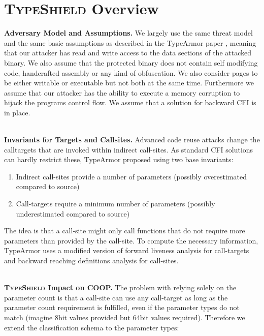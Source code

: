 \section{\textsc{TypeShield} Overview}
\label{chapter:TypeShild Overview}

\textbf{Adversary Model and Assumptions.}
\label{Adversary Model}
We largely use the same threat model and the same basic assumptions as described in the TypeArmor 
paper \cite{veen:typearmor}, meaning that our attacker has read and write access to the data 
sections of the attacked binary.  We also assume that the protected binary does not contain 
self modifying code, handcrafted assembly or any kind of obfuscation. We also consider pages 
to be either writable or executable but not both at the same time. Furthermore we assume 
that our attacker has the ability to execute a memory corruption to hijack the programs 
control flow. We assume that a solution for backward CFI is in place.

~\\
\textbf{Invariants for Targets and Callsites.}
\label{Invariants for Targets and Callsites}
Advanced code reuse attacks change the calltargets that are invoked within indirect 
call-sites. As standard CFI solutions can hardly restrict these, TypeArmor proposed using two base invariants:

\begin{enumerate}
\item Indirect call-sites provide a number of parameters (possibly overestimated compared to source)
\item Call-targets require a minimum number of parameters (possibly underestimated compared to source)
\end{enumerate}
The idea is that a call-site might only call functions that do not require more parameters than provided by the call-site. To compute the necessary information, TypeArmor uses a modified version of forward liveness analysis for call-targets and backward reaching definitions analysis for call-sites.

~\\
\textbf{\textsc{TypeShield} Impact on COOP.}
\label{TypeShild Impact on COOP}
The problem with relying solely on the parameter count is that a call-site can use any call-target as long as the parameter count requirement is fulfilled, even if the parameter types do not match (imagine 8bit values provided but 64bit values required). Therefore we extend the classification schema to the parameter types:

